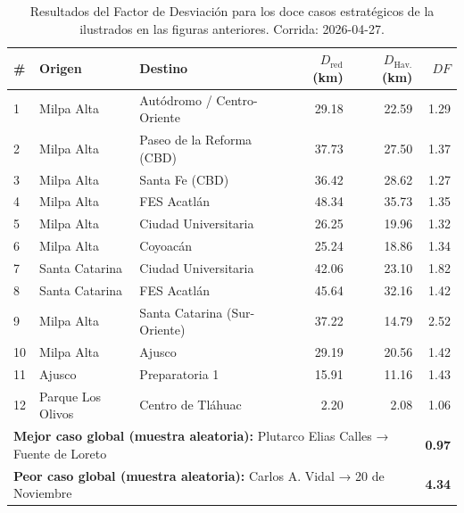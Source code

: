 \begin{table}[H]
    \centering
    \caption[Factor de Desviación — resumen de los doce casos de estudio]{
    Resultados del Factor de Desviación para los doce casos estratégicos de la
    \zmvm{} ilustrados en las figuras anteriores. Corrida: 2026-04-27.}
    \label{tab:df-casos}
    \small
    \begin{tabularx}{\textwidth}{|l|X|X|r|r|r|}
        \hline
        \textbf{\#} & \textbf{Origen} & \textbf{Destino} &
        \textbf{$D_{\text{red}}$ (km)} & \textbf{$D_{\text{Hav.}}$ (km)} & \textbf{$DF$} \\
        \hline
         1 & Milpa Alta        & Autódromo / Centro-Oriente   & 29.18 & 22.59 & 1.29 \\
         2 & Milpa Alta        & Paseo de la Reforma (CBD)    & 37.73 & 27.50 & 1.37 \\
         3 & Milpa Alta        & Santa Fe (CBD)               & 36.42 & 28.62 & 1.27 \\
         4 & Milpa Alta        & FES Acatlán                  & 48.34 & 35.73 & 1.35 \\
         5 & Milpa Alta        & Ciudad Universitaria         & 26.25 & 19.96 & 1.32 \\
         6 & Milpa Alta        & Coyoacán                     & 25.24 & 18.86 & 1.34 \\
         7 & Santa Catarina    & Ciudad Universitaria         & 42.06 & 23.10 & 1.82 \\
         8 & Santa Catarina    & FES Acatlán                  & 45.64 & 32.16 & 1.42 \\
         9 & Milpa Alta        & Santa Catarina (Sur-Oriente) & 37.22 & 14.79 & 2.52 \\
        10 & Milpa Alta        & Ajusco                       & 29.19 & 20.56 & 1.42 \\
        11 & Ajusco            & Preparatoria 1               & 15.91 & 11.16 & 1.43 \\
        12 & Parque Los Olivos & Centro de Tláhuac            &  2.20 &  2.08 & 1.06 \\
        \hline
        \multicolumn{5}{|l|}{\textbf{Mejor caso global (muestra aleatoria):}
        Plutarco Elias Calles → Fuente de Loreto} & \textbf{0.97} \\
        \multicolumn{5}{|l|}{\textbf{Peor caso global (muestra aleatoria):}
        Carlos A. Vidal → 20 de Noviembre} & \textbf{4.34} \\
        \hline
    \end{tabularx}
\end{table}

